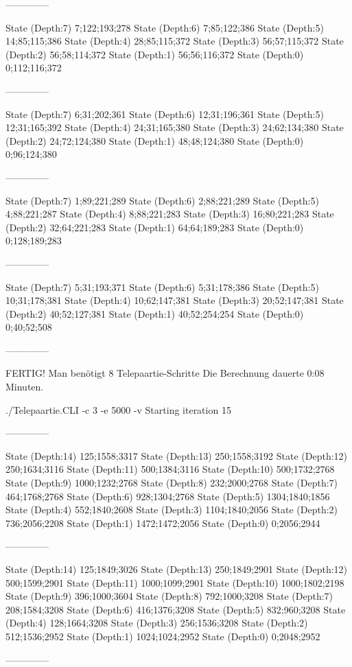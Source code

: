 \documentclass[a4paper,10pt,ngerman]{scrartcl}
\begin{document}
\begin{lstcs}
--------------

State (Depth:7) {7;122;193;278}
State (Depth:6) {7;85;122;386}
State (Depth:5) {14;85;115;386}
State (Depth:4) {28;85;115;372}
State (Depth:3) {56;57;115;372}
State (Depth:2) {56;58;114;372}
State (Depth:1) {56;56;116;372}
State (Depth:0) {0;112;116;372}

--------------

State (Depth:7) {6;31;202;361}
State (Depth:6) {12;31;196;361}
State (Depth:5) {12;31;165;392}
State (Depth:4) {24;31;165;380}
State (Depth:3) {24;62;134;380}
State (Depth:2) {24;72;124;380}
State (Depth:1) {48;48;124;380}
State (Depth:0) {0;96;124;380}

--------------

State (Depth:7) {1;89;221;289}
State (Depth:6) {2;88;221;289}
State (Depth:5) {4;88;221;287}
State (Depth:4) {8;88;221;283}
State (Depth:3) {16;80;221;283}
State (Depth:2) {32;64;221;283}
State (Depth:1) {64;64;189;283}
State (Depth:0) {0;128;189;283}

--------------

State (Depth:7) {5;31;193;371}
State (Depth:6) {5;31;178;386}
State (Depth:5) {10;31;178;381}
State (Depth:4) {10;62;147;381}
State (Depth:3) {20;52;147;381}
State (Depth:2) {40;52;127;381}
State (Depth:1) {40;52;254;254}
State (Depth:0) {0;40;52;508}

--------------


FERTIG!
Man benötigt 8 Telepaartie-Schritte
Die Berechnung dauerte 0:08 Minuten.
\end{lstcs}
\begin{lstcs}
./Telepaartie.CLI -c 3 -e 5000 -v
Starting iteration 15

--------------

State (Depth:14) {125;1558;3317}
State (Depth:13) {250;1558;3192}
State (Depth:12) {250;1634;3116}
State (Depth:11) {500;1384;3116}
State (Depth:10) {500;1732;2768}
State (Depth:9) {1000;1232;2768}
State (Depth:8) {232;2000;2768}
State (Depth:7) {464;1768;2768}
State (Depth:6) {928;1304;2768}
State (Depth:5) {1304;1840;1856}
State (Depth:4) {552;1840;2608}
State (Depth:3) {1104;1840;2056}
State (Depth:2) {736;2056;2208}
State (Depth:1) {1472;1472;2056}
State (Depth:0) {0;2056;2944}

--------------

State (Depth:14) {125;1849;3026}
State (Depth:13) {250;1849;2901}
State (Depth:12) {500;1599;2901}
State (Depth:11) {1000;1099;2901}
State (Depth:10) {1000;1802;2198}
State (Depth:9) {396;1000;3604}
State (Depth:8) {792;1000;3208}
State (Depth:7) {208;1584;3208}
State (Depth:6) {416;1376;3208}
State (Depth:5) {832;960;3208}
State (Depth:4) {128;1664;3208}
State (Depth:3) {256;1536;3208}
State (Depth:2) {512;1536;2952}
State (Depth:1) {1024;1024;2952}
State (Depth:0) {0;2048;2952}

--------------
\end{lstcs}
\end{document}
